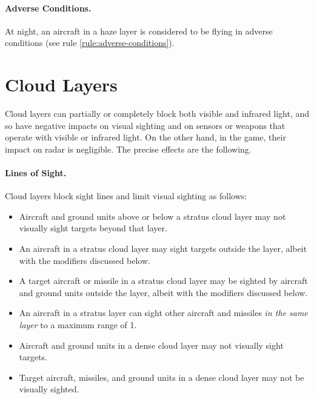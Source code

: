 \begin{advancedrules}
{\paragraph{Adverse Conditions.} At night, an aircraft in a haze layer is considered to be flying in adverse conditions (see rule \ref{rule:adverse-conditions}).


\section{Cloud Layers}
\label{rule:cloud-layers}

Cloud layers can partially or completely block both visible and infrared light, and so have negative impacts on visual sighting and on sensors or weapons that operate with visible or infrared light. On the other hand, in the game, their impact on radar is negligible. The precise effects are the following.

\paragraph{Lines of Sight.} Cloud layers block sight lines and limit visual sighting as follows:

\begin{itemize}

\item
Aircraft and ground units above or below a stratus cloud layer may not visually sight targets beyond that layer.

\item An aircraft in a stratus cloud layer may sight targets outside the layer, albeit with the modifiers discussed below.

\item A target aircraft or missile in a stratus cloud layer may be sighted by aircraft and ground units outside the layer, albeit with the modifiers discussed below.

\item An aircraft in a stratus layer can sight other aircraft and missiles \emph{in the same layer} to a maximum range of 1.

\item
Aircraft and ground units in a dense cloud layer may not visually sight targets.

\item 
Target aircraft, missiles, and ground units in a dense cloud layer may not be visually sighted.

\end{itemize}

}
\end{advancedrules}
